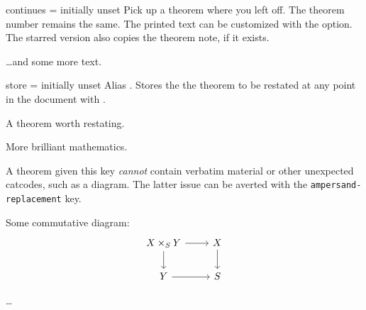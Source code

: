 \documentclass{ltxdoc}
\begin{document}
\begin{docKey}{continues}
  {\sarg=}
  {initially unset}
Pick up a theorem where you left off. The theorem number remains the same. The printed text can be customized with the  option. The starred version also copies the theorem note, if it exists.

\begin{keythmscode}[]
\begin{theorem}[continues=foo]
\dots and some more text.
\end{theorem}
\end{keythmscode}

\end{docKey}

\begin{docKey}{store}
  {=}
  {initially unset}
Alias . Stores the the theorem to be restated at any point in the document with .

\begin{keythmscode}[]
\begin{theorem}[store=blub]
A theorem worth restating.
\end{theorem}
More brilliant mathematics.
\end{keythmscode}

A theorem given this key \emph{cannot} contain verbatim material or other unexpected catcodes, such as a  diagram. The latter issue can be averted with the \texttt{ampersand-replacement} key.

\begin{tcbwritetemp}
\usepackage{tikz}
\usetikzlibrary{cd}
\end{tcbwritetemp}

\begin{keythmscode}[withpreamble]
\begin{lemma}[store=diagram]
Some commutative diagram:
\[\begin{tikzcd}[ampersand replacement=\&]
X\times_S Y \ar[r] \ar[d] \& X \ar[d] \\
Y \ar[r] \& S
\end{tikzcd}\]
\end{lemma}
\dots
{}
\end{keythmscode}

\end{docKey}
\end{document}
